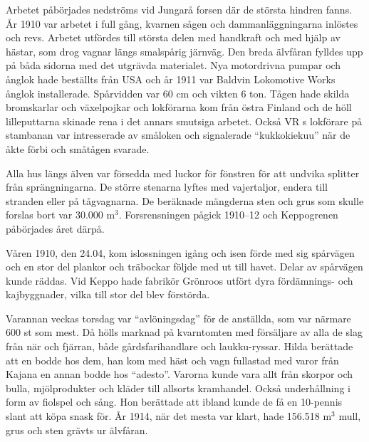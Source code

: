 
Arbetet påbörjades nedströms vid Jungarå forsen där de största 	hindren fanns. År 1910 var arbetet i full gång, kvarnen sågen och dammanläggningarna inlöstes och revs. Arbetet utfördes till största delen med handkraft och med hjälp av hästar, som drog vagnar längs smalspårig järnväg. Den breda älvfåran fylldes upp 	på båda sidorna med det utgrävda materialet. Nya motordrivna pumpar och ånglok hade beställts från USA och år 1911 var Baldvin Lokomotive Works ånglok installerade. Spårvidden var 60 cm och vikten 6 ton. Tågen hade skilda bromskarlar och växelpojkar och lokförarna kom från östra Finland och de höll lilleputtarna skinade rena i det annars smutsiga arbetet. Också VR s lokförare på stambanan var intresserade av småloken och 	signalerade ``kukkokiekuu'' när de åkte förbi och småtågen svarade.


Alla hus längs älven var försedda med luckor för fönstren för att undvika splitter från sprängningarna. De större stenarna lyftes med vajertaljor, endera till stranden eller på tågvagnarna. De beräknade mängderna sten och grus som  skulle forslas bort var 30.000 m$^3$. Forsrensningen pågick 1910--12 och Keppogrenen påbörjades året därpå.

Våren 1910, den 24.04, kom islossningen igång och isen förde med sig spårvägen och en stor del plankor och träbockar följde med ut till havet. Delar av spårvägen kunde räddas. Vid Keppo hade fabrikör Grönroos utfört dyra fördämnings- och kajbyggnader, vilka till stor del blev förstörda.

Varannan veckas torsdag var ``avlöningsdag'' för de anställda, som var närmare 600 st som mest. Då hölls marknad på kvarntomten med försäljare av alla de slag från när och fjärran, både gårdsfarihandlare och laukku-ryssar. Hilda berättade att en bodde hos dem, han kom med häst och vagn fullastad med varor från Kajana en annan bodde hos ``adesto''. Varorna kunde vara allt från skorpor och bulla, mjölprodukter och kläder till allsorts kramhandel. Också underhållning i form av fiolspel och sång. Hon berättade att ibland kunde de få en 10-pennis slant att köpa snask för. År 1914, när det mesta var klart, hade 156.518 m$^3$ mull, grus och sten grävts ur älvfåran.


%

